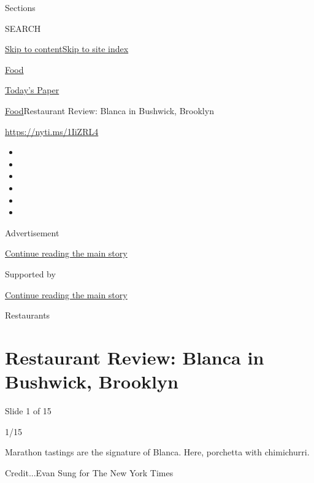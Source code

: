 Sections

SEARCH

\protect\hyperlink{site-content}{Skip to
content}\protect\hyperlink{site-index}{Skip to site index}

\href{https://www.nytimes3xbfgragh.onion/section/food}{Food}

\href{https://myaccount.nytimes3xbfgragh.onion/auth/login?response_type=cookie\&client_id=vi}{}

\href{https://www.nytimes3xbfgragh.onion/section/todayspaper}{Today's
Paper}

\href{/section/food}{Food}\textbar{}Restaurant Review: Blanca in
Bushwick, Brooklyn

\url{https://nyti.ms/1IiZRL4}

\begin{itemize}
\item
\item
\item
\item
\item
\item
\end{itemize}

Advertisement

\protect\hyperlink{after-top}{Continue reading the main story}

Supported by

\protect\hyperlink{after-sponsor}{Continue reading the main story}

Restaurants

\hypertarget{restaurant-review-blanca-in-bushwick-brooklyn}{%
\section{Restaurant Review: Blanca in Bushwick,
Brooklyn}\label{restaurant-review-blanca-in-bushwick-brooklyn}}

Slide 1 of 15

1/15

Marathon tastings are the signature of Blanca. Here, porchetta with
chimichurri.

Credit...Evan Sung for The New York Times

